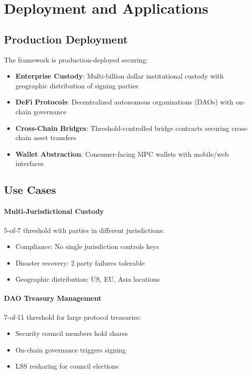 \section{Deployment and Applications}


\subsection{Production Deployment}

The framework is production-deployed securing:
\begin{itemize}
\item \textbf{Enterprise Custody}: Multi-billion dollar institutional custody with geographic distribution of signing parties
\item \textbf{DeFi Protocols}: Decentralized autonomous organizations (DAOs) with on-chain governance
\item \textbf{Cross-Chain Bridges}: Threshold-controlled bridge contracts securing cross-chain asset transfers
\item \textbf{Wallet Abstraction}: Consumer-facing MPC wallets with mobile/web interfaces
\end{itemize}

\subsection{Use Cases}

\paragraph{Multi-Jurisdictional Custody} 5-of-7 threshold with parties in different jurisdictions:
\begin{itemize}
\item Compliance: No single jurisdiction controls keys
\item Disaster recovery: 2 party failures tolerable
\item Geographic distribution: US, EU, Asia locations
\end{itemize}

\paragraph{DAO Treasury Management} 7-of-11 threshold for large protocol treasuries:
\begin{itemize}
\item Security council members hold shares
\item On-chain governance triggers signing
\item LSS resharing for council elections
\end{itemize}

